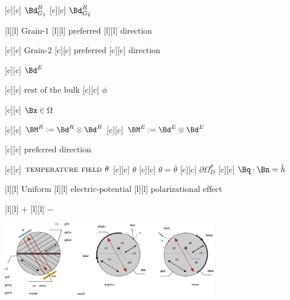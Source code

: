 [c][c] {\small $\Bd^{R}_{G_1}$}
[c][c] {\small $\Bd^{R}_{G_2}$}

[l][l] {\small $\text{Grain-1}$}
[l][l] {\small $\text{preferred}$}
[l][l] {\small $\text{direction}$}

[c][c] {\small$\text{Grain-2}$}
[c][c] {\small$\text{preferred}$}
[c][c] {\small$\text{direction}$}

[c][c] {\small $\Bd^{E}$}

[c][c] {\small $\text{rest of the bulk}$}
[c][c] {\small $\phi$}

[c][c] {\small $\Bx \in \Omega$}

[c][c] {\small $\BM^{R} := \Bd^{R} \otimes \Bd^{R}$}
[c][c] {\small $\BM^{E} := \Bd^{E} \otimes \Bd^{E}$}

[c][c] {\small $\text{preferred direction}$}

[c][c] {\small $\textsc{temperature field } \theta$}
[c][c] {\small $\theta$}
[c][c] {\small $\theta = \bar{\theta}$}
[c][c] {\small $\partial\Omega^{\theta}_{D}$}
[c][c] {\small $\Bq\cdot\Bn = \bar{h}$}

[l][l] {\small $\text{Uniform}$}
[l][l] {\small $\text{electric-potential}$}
[l][l] {\small $\text{polarizational effect}$}

[l][l] {\small $+$}
[l][l] {\small $-$}

\includegraphics[width=0.7\textwidth]{structuraltwofields.eps}
